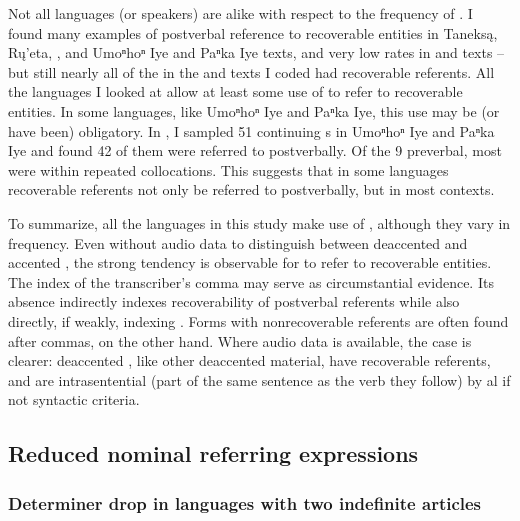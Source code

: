 \documentclass[output=paper]{LSP/langsci}
\begin{document}
Not all languages (or speakers) are alike with respect to the frequency of . I found many examples of postverbal reference to recoverable entities in Taneksą, Rų’eta, , and Umoⁿhoⁿ Iye and Paⁿka Iye texts, and very low rates in  and  texts -- but still nearly all of the  in the  and  texts I coded had recoverable referents. All the languages I looked at allow at least some use of  to refer to recoverable entities. In some languages, like Umoⁿhoⁿ Iye and Paⁿka Iye, this use may be (or have been) obligatory. In \citet{Gordon2008}, I sampled 51 continuing s in Umoⁿhoⁿ Iye and Paⁿka Iye and found 42 of them were referred to postverbally. Of the 9 preverbal, most were within repeated collocations. This suggests that in some languages recoverable referents not only  be referred to postverbally, but  in most contexts.

To summarize, all the languages in this study make use of , although they vary in frequency. Even without audio data to distinguish between deaccented and accented , the strong tendency is observable for  to refer to recoverable entities. The index of the transcriber’s comma may serve as circumstantial evidence. Its absence indirectly indexes recoverability of postverbal referents while also directly, if weakly, indexing . Forms with nonrecoverable referents are often found after commas, on the other hand. Where audio data is available, the case is clearer: deaccented , like other deaccented material, have recoverable referents, and are intrasentential (part of the same sentence as the verb they follow) by al if not syntactic criteria.

\subsection{Reduced nominal referring expressions}\label{nominalreduction}

\subsubsection{Determiner drop in languages with two indefinite articles}\label{droptwoindef}
\end{document}
